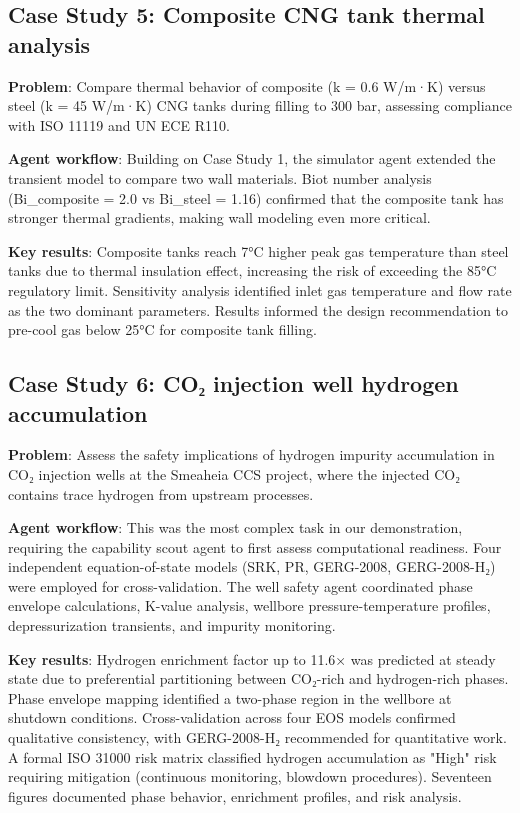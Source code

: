 \documentclass[review,3p]{elsarticle}
\begin{document}
\subsection{Case Study 5: Composite CNG tank thermal analysis}

\textbf{Problem}: Compare thermal behavior of composite (k = 0.6 W/m·K) versus steel (k = 45 W/m·K) CNG tanks during filling to 300 bar, assessing compliance with ISO 11119 and UN ECE R110.

\textbf{Agent workflow}: Building on Case Study 1, the simulator agent extended the transient model to compare two wall materials. Biot number analysis (Bi_composite = 2.0 vs Bi_steel = 1.16) confirmed that the composite tank has stronger thermal gradients, making wall modeling even more critical.

\textbf{Key results}: Composite tanks reach 7°C higher peak gas temperature than steel tanks due to thermal insulation effect, increasing the risk of exceeding the 85°C regulatory limit. Sensitivity analysis identified inlet gas temperature and flow rate as the two dominant parameters. Results informed the design recommendation to pre-cool gas below 25°C for composite tank filling.

\subsection{Case Study 6: CO₂ injection well hydrogen accumulation}

\textbf{Problem}: Assess the safety implications of hydrogen impurity accumulation in CO₂ injection wells at the Smeaheia CCS project, where the injected CO₂ contains trace hydrogen from upstream processes.

\textbf{Agent workflow}: This was the most complex task in our demonstration, requiring the capability scout agent to first assess computational readiness. Four independent equation-of-state models (SRK, PR, GERG-2008, GERG-2008-H₂) were employed for cross-validation. The well safety agent coordinated phase envelope calculations, K-value analysis, wellbore pressure-temperature profiles, depressurization transients, and impurity monitoring.

\textbf{Key results}: Hydrogen enrichment factor up to 11.6× was predicted at steady state due to preferential partitioning between CO₂-rich and hydrogen-rich phases. Phase envelope mapping identified a two-phase region in the wellbore at shutdown conditions. Cross-validation across four EOS models confirmed qualitative consistency, with GERG-2008-H₂ recommended for quantitative work. A formal ISO 31000 risk matrix classified hydrogen accumulation as "High" risk requiring mitigation (continuous monitoring, blowdown procedures). Seventeen figures documented phase behavior, enrichment profiles, and risk analysis.
\end{document}

